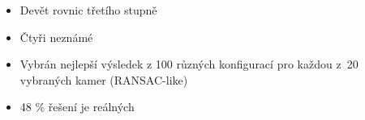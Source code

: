 \documentclass[cmpiitalkstyle, 22pt]{cmptalk}
\begin{document}
\begin{cmptalkslide}
  \begin{minipage}{0.45\textwidth}
    \begin{itemize}
      \item Devět rovnic třetího stupně
      \item Čtyři neznámé
      \item Vybrán nejlepší výsledek z 100 různých konfigurací pro každou z~20 vybraných kamer (RANSAC-like)
      \item 48 \% řešení je reálných
    \end{itemize}
  \end{minipage}


\end{cmptalkslide}
\end{document}

